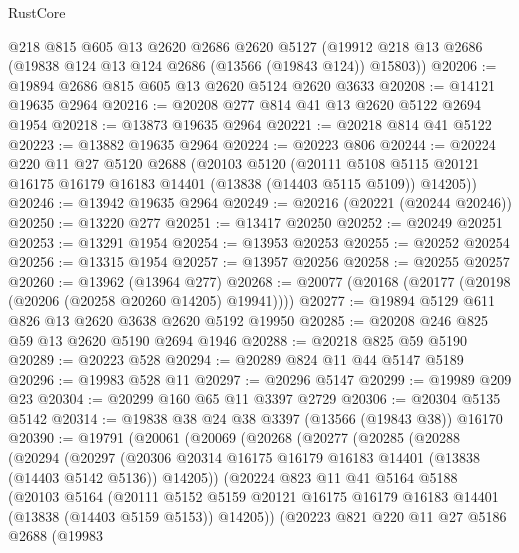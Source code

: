 \begin{lexlean}{RustCore}
\begin{coremodule}
    @218
    @815
    @605
    @13
    @2620
    @2686
    @2620
    @5127
    (@19912 @218 @13 @2686 (@19838 @124 @13 @124 @2686 (@13566 (@19843 @124)) @15803))
@20206 := @19894 @2686 @815 @605 @13 @2620 @5124 @2620 @3633
@20208 := @14121 @19635 @2964
@20216 := @20208 @277 @814 @41 @13 @2620 @5122 @2694 @1954
@20218 := @13873 @19635 @2964
@20221 := @20218 @814 @41 @5122
@20223 := @13882 @19635 @2964
@20224 := @20223 @806
@20244 := @20224
    @220
    @11
    @27
    @5120
    @2688
    (@20103
      @5120
      (@20111 @5108 @5115 @20121 @16175 @16179 @16183 @14401 (@13838 (@14403 @5115 @5109)) @14205))
@20246 := @13942 @19635 @2964
@20249 := @20216 (@20221 (@20244 @20246))
@20250 := @13220 @277
@20251 := @13417 @20250
@20252 := @20249 @20251
@20253 := @13291 @1954
@20254 := @13953 @20253
@20255 := @20252 @20254
@20256 := @13315 @1954
@20257 := @13957 @20256
@20258 := @20255 @20257
@20260 := @13962 (@13964 @277)
@20268 := @20077 (@20168 (@20177 (@20198 (@20206 (@20258 @20260 @14205) @19941))))
@20277 := @19894 @5129 @611 @826 @13 @2620 @3638 @2620 @5192 @19950
@20285 := @20208 @246 @825 @59 @13 @2620 @5190 @2694 @1946
@20288 := @20218 @825 @59 @5190
@20289 := @20223 @528
@20294 := @20289 @824 @11 @44 @5147 @5189
@20296 := @19983 @528 @11
@20297 := @20296 @5147
@20299 := @19989 @209 @23
@20304 := @20299 @160 @65 @11 @3397 @2729
@20306 := @20304 @5135 @5142
@20314 := @19838 @38 @24 @38 @3397 (@13566 (@19843 @38)) @16170
@20390 := @19791
    (@20061
      (@20069
        (@20268
          (@20277
            (@20285
              (@20288
                (@20294
                  (@20297
                    (@20306
                      @20314
                      @16175
                      @16179
                      @16183
                      @14401
                      (@13838 (@14403 @5142 @5136))
                      @14205))
                  (@20224
                    @823
                    @11
                    @41
                    @5164
                    @5188
                    (@20103
                      @5164
                      (@20111
                        @5152
                        @5159
                        @20121
                        @16175
                        @16179
                        @16183
                        @14401
                        (@13838 (@14403 @5159 @5153))
                        @14205))
                    (@20223
                      @821
                      @220
                      @11
                      @27
                      @5186
                      @2688
                      (@19983

\end{coremodule}
\end{lexlean}
